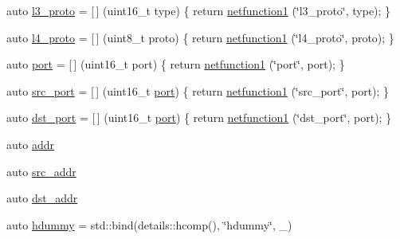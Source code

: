 \begin{DoxyCompactItemize}
\item 
auto \hyperlink{namespacepfq__lang_1_1anonymous__namespace_02default_8hpp_03_aed01dd5380a873d92397ec0d4c07abac}{l3\-\_\-proto} = \mbox{[}$\,$\mbox{]} (uint16\-\_\-t type) \{ return \hyperlink{namespacepfq__lang_af215f25fa7ebd61fdc90cf0ef78a3164}{netfunction1} (\char`\"{}l3\-\_\-proto\char`\"{}, type); \}
\item 
auto \hyperlink{namespacepfq__lang_1_1anonymous__namespace_02default_8hpp_03_a75da77904f1cff4cc42fc3a081f80670}{l4\-\_\-proto} = \mbox{[}$\,$\mbox{]} (uint8\-\_\-t proto) \{ return \hyperlink{namespacepfq__lang_af215f25fa7ebd61fdc90cf0ef78a3164}{netfunction1} (\char`\"{}l4\-\_\-proto\char`\"{}, proto); \}
\item 
auto \hyperlink{namespacepfq__lang_1_1anonymous__namespace_02default_8hpp_03_a1b370b44e5eedc364f3bb306d5042738}{port} = \mbox{[}$\,$\mbox{]} (uint16\-\_\-t port) \{ return \hyperlink{namespacepfq__lang_af215f25fa7ebd61fdc90cf0ef78a3164}{netfunction1} (\char`\"{}port\char`\"{}, port); \}
\item 
auto \hyperlink{namespacepfq__lang_1_1anonymous__namespace_02default_8hpp_03_ad4d03d1e69ba9608a2d87ac91a2b521f}{src\-\_\-port} = \mbox{[}$\,$\mbox{]} (uint16\-\_\-t \hyperlink{namespacepfq__lang_1_1anonymous__namespace_02default_8hpp_03_a1b370b44e5eedc364f3bb306d5042738}{port}) \{ return \hyperlink{namespacepfq__lang_af215f25fa7ebd61fdc90cf0ef78a3164}{netfunction1} (\char`\"{}src\-\_\-port\char`\"{}, port); \}
\item 
auto \hyperlink{namespacepfq__lang_1_1anonymous__namespace_02default_8hpp_03_aceccbe6ec912638fb8d5d3d9e0372a09}{dst\-\_\-port} = \mbox{[}$\,$\mbox{]} (uint16\-\_\-t \hyperlink{namespacepfq__lang_1_1anonymous__namespace_02default_8hpp_03_a1b370b44e5eedc364f3bb306d5042738}{port}) \{ return \hyperlink{namespacepfq__lang_af215f25fa7ebd61fdc90cf0ef78a3164}{netfunction1} (\char`\"{}dst\-\_\-port\char`\"{}, port); \}
\item 
auto \hyperlink{namespacepfq__lang_1_1anonymous__namespace_02default_8hpp_03_aafce8334d1be83bff9a2115439c8c453}{addr}
\item 
auto \hyperlink{namespacepfq__lang_1_1anonymous__namespace_02default_8hpp_03_a63c87ff605d7cefa807fd61bc463785d}{src\-\_\-addr}
\item 
auto \hyperlink{namespacepfq__lang_1_1anonymous__namespace_02default_8hpp_03_a4b72bac7c3af312ffe7c670eb2583f9a}{dst\-\_\-addr}
\item 
auto \hyperlink{namespacepfq__lang_1_1anonymous__namespace_02default_8hpp_03_a4e7cf4874b42c5722f420fc54f360242}{hdummy} = std\-::bind(details\-::hcomp(), \char`\"{}hdummy\char`\"{}, \-\_)

\end{DoxyCompactItemize}

